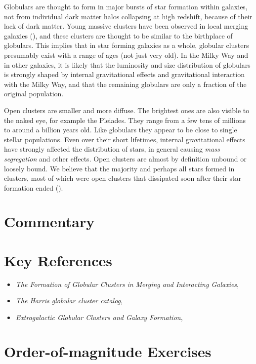 Globulars are thought to form in major bursts of star formation within
galaxies, not from individual dark matter halos collapsing at high
redshift, because of their lack of dark matter. Young massive clusters
have been observed in local merging galaxies (\citealt{ashman92a}),
and these clusters are thought to be similar to the birthplace of
globulars. This implies that in star forming galaxies as a whole,
globular clusters presumably exist with a range of ages (not just very
old).  In the Milky Way and in other galaxies, it is likely that the
luminosity and size distribution of globulars is strongly shaped by
internal gravitational effects and gravitational interaction with the
Milky Way, and that the remaining globulars are only a fraction of the
original population.

Open clusters are smaller and more diffuse. The brightest ones are
also visible to the naked eye, for example the Pleiades. They range
from a few tens of millions to around a billion years old. Like
globulars they appear to be close to single stellar populations. Even
over their short lifetimes, internal gravitational effects have
strongly affected the distribution of stars, in general causing {\it
mass segregation} and other effects. Open clusters are almost by
definition unbound or loosely bound. We believe that the majority and
perhaps all stars formed in clusters, most of which were open clusters
that dissipated soon after their star formation ended
(\citealt{lada03a}).

\section{Commentary}

\section{Key References}

\begin{itemize}
  \item
    {\it The Formation of Globular Clusters in Merging and Interacting
    Galaxies}, \citet{ashman92a}
  \item
    \href{http://physwww.mcmaster.ca/~harris/mwgc.dat}{\it The Harris globular cluster catalog}, \citet{harris96a}
  \item
    {\it Extragalactic Globular Clusters and Galaxy
    Formation}, \citet{brodie06a}
\end{itemize}

\section{Order-of-magnitude Exercises}

